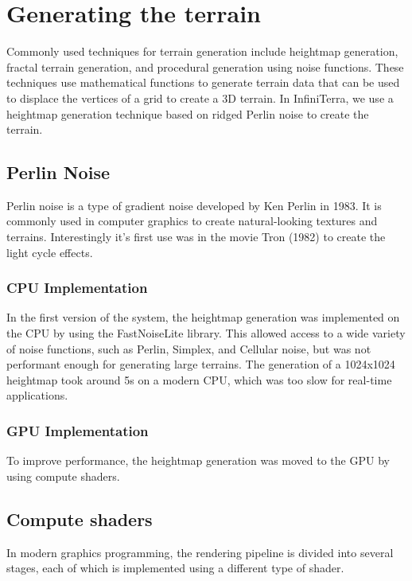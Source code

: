\documentclass{report}
\begin{document}

\chapter{Generating the terrain}
\label{ch:generating-the-terrain}
Commonly used techniques for terrain generation include heightmap generation, fractal terrain
generation, and procedural generation using noise functions. These techniques use mathematical
functions to generate terrain data that can be used to displace the vertices of a grid to create a
3D terrain. In InfiniTerra, we use a heightmap generation technique based on ridged Perlin noise to
create the terrain.
\section{Perlin Noise}
Perlin noise is a type of gradient noise developed by Ken Perlin in 1983.
It is commonly used in computer graphics to create natural-looking textures and terrains.
Interestingly it's first use was in the movie Tron (1982) to create the light cycle effects.
\subsection{CPU Implementation}
In the first version of the system, the heightmap generation was implemented on the CPU by using
the FastNoiseLite library. This allowed access to a wide variety of noise functions, such as
Perlin, Simplex, and Cellular noise, but was not performant enough for generating large terrains.
The generation of a 1024x1024 heightmap took around 5s on a modern CPU, which was too slow for
real-time applications.
\subsection{GPU Implementation}
To improve performance, the heightmap generation was moved to the GPU by using compute shaders.

\section{Compute shaders}
In modern graphics programming, the rendering pipeline is divided into several stages, each of
which is implemented using a different type of shader.
\end{document}
